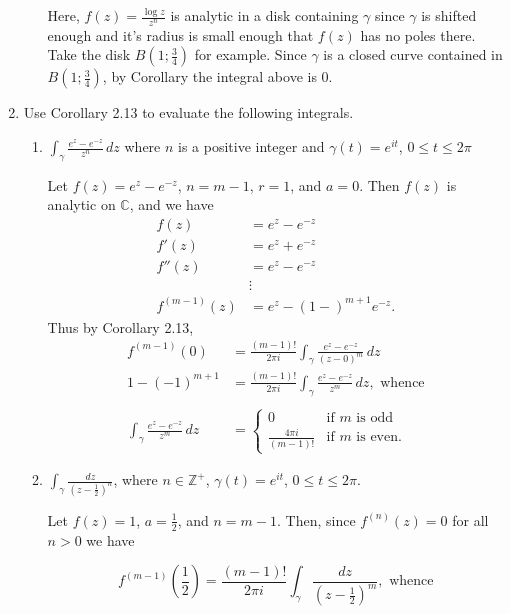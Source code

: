\documentclass[11pt,oneside,english]{amsart}
\theoremstyle{definition}
\newcommand{\MB}[1]{\mathbb{#1}}
\begin{document}
\begin{enumerate}[leftmargin=*]
\begin{enumerate}
Here, $f(z)=\frac{\log z}{z^n}$ is analytic in a disk containing $\gamma$ since $\gamma$ is shifted enough and it's radius is small enough that $f(z)$ has no poles there. Take the disk $B(1;\frac{3}{4})$ for example. Since $\gamma$ is a closed curve contained in $B(1;\frac{3}{4})$, by Corollary the integral above is 0.
\end{enumerate}

\pagebreak

\setcounter{enumi}{8}

\item Use Corollary 2.13 to evaluate the following integrals.

\begin{enumerate}
\itemsep5mm
\item $\displaystyle \int_\gamma\frac{e^z-e^{-z}}{z^n}\,dz$ where $n$ is a positive integer and $\gamma(t)=e^{it}$, $0\leq t\leq 2\pi$

Let $f(z)=e^z-e^{-z}$, $n=m-1$, $r=1$, and $a=0$. Then $f(z)$ is analytic on $\MB{C}$, and we have
\begin{align*}
f(z)&=e^z-e^{-z}\\[2mm]
f'(z)&=e^z+e^{-z}\\[2mm]
f''(z)&=e^z-e^{-z}\\[2mm]
&\vdots\\[2mm]
f^{(m-1)}(z)&=e^z-(1-)^{m+1}e^{-z}.
\end{align*}
Thus by Corollary 2.13,
\begin{align*}
f^{(m-1)}(0)&=\frac{(m-1)!}{2\pi i}\int_\gamma \frac{e^z-e^{-z}}{(z-0)^m}\,dz\\[2mm]
1-(-1)^{m+1}&=\frac{(m-1)!}{2\pi i}\int_\gamma \frac{e^z-e^{-z}}{z^m}\,dz,\text{ whence}\\[2mm]
\\
\int_\gamma \frac{e^z-e^{-z}}{z^m}\,dz&=\begin{cases}0 & \text{if $m$ is odd} \\ \frac{4\pi i}{(m-1)!} & \text{if $m$ is even.}\end{cases}
\end{align*}

\item $\displaystyle \int_\gamma \frac{dz}{(z-\frac{1}{2})^n}$, where $n\in \MB{Z}^+$, $\gamma(t)=e^{it}$, $0\leq t\leq 2\pi$.

Let $f(z)=1$, $a=\frac{1}{2}$, and $n=m-1$. Then, since $f^{(n)}(z)=0$ for all $n>0$ we have

\[
f^{(m-1)}\left(\frac{1}{2}\right)=\frac{(m-1)!}{2\pi i}\int_\gamma \frac{dz}{(z-\frac{1}{2})^m},\text{ whence}
\]


\end{enumerate}
\end{enumerate}
\end{document}
